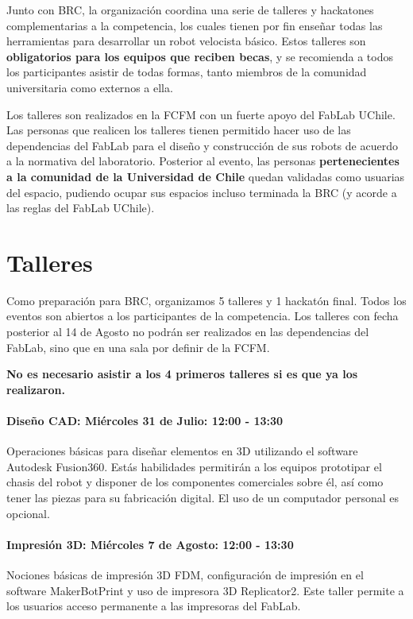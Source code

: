 Junto con BRC, la organización coordina una serie de talleres y hackatones complementarias a la competencia, los cuales tienen por fin enseñar todas las herramientas para desarrollar un robot velocista básico. Estos talleres son \textbf{obligatorios para los equipos que reciben becas}, y se recomienda a todos los participantes asistir de todas formas, tanto miembros de la comunidad universitaria como externos a ella. 

Los talleres son realizados en la FCFM con un fuerte apoyo del FabLab UChile. 
Las personas que realicen los talleres tienen permitido hacer uso de las dependencias del FabLab para el diseño y construcción de sus robots de acuerdo a la normativa del laboratorio.
Posterior al evento, las personas \textbf{pertenecientes a la comunidad de la Universidad de Chile} quedan validadas como usuarias del espacio, pudiendo ocupar sus espacios incluso terminada la BRC (y acorde a las reglas del FabLab UChile).

\section{Talleres}

Como preparación para BRC, organizamos 5 talleres y 1 hackatón final.
Todos los eventos son abiertos a los participantes de la competencia.
Los talleres con fecha posterior al 14 de Agosto no podrán ser realizados en las dependencias del FabLab, sino que en una sala por definir de la FCFM.

\textbf{No es necesario asistir a los 4 primeros talleres si es que ya los realizaron.}

\paragraph*{Diseño CAD: Miércoles 31 de Julio: 12:00 - 13:30}
Operaciones básicas para diseñar elementos en 3D utilizando el software Autodesk Fusion360.
Estás habilidades permitirán a los equipos prototipar el chasis del robot y disponer de los componentes comerciales sobre él, así como tener las piezas para su fabricación digital.
El uso de un computador personal es opcional.

\paragraph*{Impresión 3D: Miércoles 7 de Agosto: 12:00 - 13:30}
Nociones básicas de impresión 3D FDM, configuración de impresión en el software MakerBotPrint y uso de impresora 3D Replicator2.
Este taller permite a los usuarios acceso permanente a las impresoras del FabLab.

